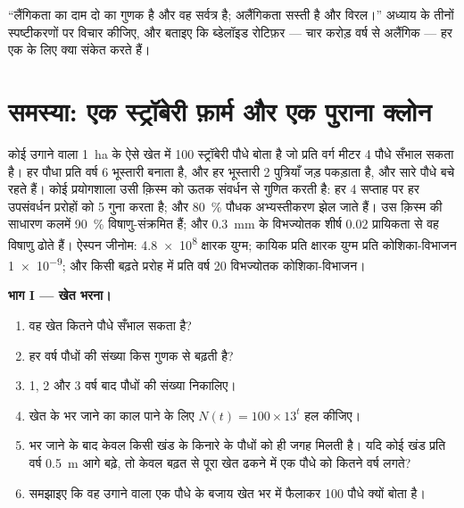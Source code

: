 \begin{exercise}[$\star\star\star$]\label{exo:b2:asexual-reproduction:12}
``लैंगिकता का दाम दो का गुणक है और वह सर्वत्र है; अलैंगिकता सस्ती है
और विरल।'' अध्याय के तीनों स्पष्टीकरणों पर विचार कीजिए, और बताइए कि
ब्डेलॉइड रोटिफ़र --- चार करोड़ वर्ष से अलैंगिक --- हर एक के लिए
क्या संकेत करते हैं।
\end{exercise}

\section{समस्या: एक स्ट्रॉबेरी फ़ार्म और एक पुराना क्लोन}

\begin{problem}
\label{pb:b2:asexual-reproduction:1}
कोई उगाने वाला \qty{1}{ha} के ऐसे खेत में \num{100} स्ट्रॉबेरी पौधे
बोता है जो प्रति वर्ग मीटर \num{4} पौधे सँभाल सकता है। हर
पौधा प्रति वर्ष \num{6} भूस्तारी बनाता है, और हर भूस्तारी \num{2}
पुत्रियाँ जड़ पकड़ाता है, और सारे पौधे बचे रहते हैं। कोई प्रयोगशाला उसी
क़िस्म को ऊतक संवर्धन से गुणित करती है: हर \num{4} सप्ताह पर हर उपसंवर्धन
प्ररोहों को \num{5} गुना करता है; और \qty{80}{\%} पौधक अभ्यस्तीकरण झेल
जाते हैं। उस क़िस्म की साधारण कलमें \qty{90}{\%} विषाणु-संक्रमित हैं;
और \qty{0.3}{mm} के विभज्योतक शीर्ष $0.02$ प्रायिकता से वह विषाणु ढोते
हैं। ऐस्पन जीनोम: \qty{4.8e8}{} क्षारक युग्म; कायिक 
प्रति क्षारक युग्म प्रति कोशिका-विभाजन \qty{1e-9}{}; और किसी बढ़ते
प्ररोह में प्रति वर्ष \num{20} विभज्योतक कोशिका-विभाजन।

\medskip
\noindent\textbf{भाग I --- खेत भरना।}
\begin{enumerate}
  \item वह खेत कितने पौधे सँभाल सकता है?
  \item हर वर्ष पौधों की संख्या किस गुणक से बढ़ती है?
  \item 1, 2 और 3 वर्ष बाद पौधों की संख्या निकालिए।
  \item खेत के भर जाने का काल पाने के लिए $N(t) = 100\times 13^{t}$
        हल कीजिए।
  \item भर जाने के बाद केवल किसी खंड के किनारे के पौधों को ही जगह
        मिलती है। यदि कोई खंड प्रति वर्ष \qty{0.5}{m} आगे बढ़े, तो
        केवल बढ़त से पूरा खेत ढकने में एक पौधे को कितने वर्ष लगते?
  \item समझाइए कि वह उगाने वाला एक पौधे के बजाय खेत भर में फैलाकर
        \num{100} पौधे क्यों बोता है।
\end{enumerate}


\end{problem}
